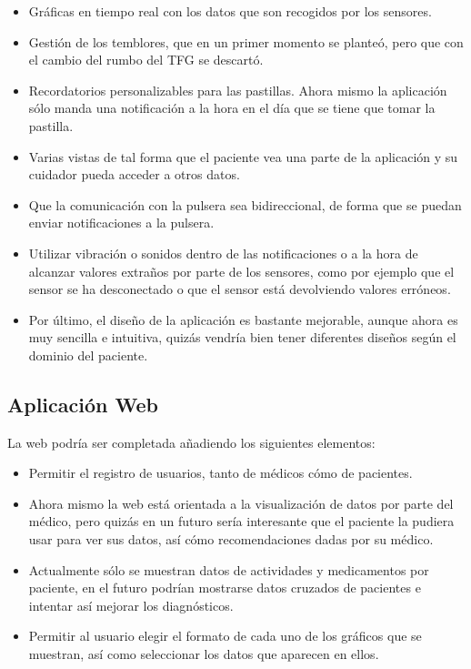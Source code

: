 \documentclass[11pt,spanish]{article}
\begin{document}
\begin{itemize}
	\item Gráficas en tiempo real con los datos que son recogidos por los sensores.
    \item Gestión de los temblores, que en un primer momento se planteó, pero que con el cambio del rumbo del TFG se descartó.
    \item Recordatorios personalizables para las pastillas. Ahora mismo la aplicación sólo manda una notificación a la hora en el día que se tiene que tomar la pastilla.
    \item Varias vistas de tal forma que el paciente vea una parte de la aplicación y su cuidador pueda acceder a otros datos.
    \item Que la comunicación con la pulsera sea bidireccional, de forma que se puedan enviar notificaciones a la pulsera.
    \item Utilizar vibración o sonidos dentro de las notificaciones o a la hora de alcanzar valores extraños por parte de los sensores, como por ejemplo que el sensor se ha desconectado o que el sensor está devolviendo valores erróneos.
    \item Por último, el diseño de la aplicación es bastante mejorable, aunque ahora es muy sencilla e intuitiva, quizás vendría bien tener diferentes diseños según el dominio del paciente.
\end{itemize}

\subsection{Aplicación Web}
La web podría ser completada añadiendo los siguientes elementos:

\begin{itemize}
	\item Permitir el registro de usuarios, tanto de médicos cómo de pacientes.
    \item Ahora mismo la web está orientada a la visualización de datos por parte del médico, pero quizás en un futuro sería interesante que el paciente la pudiera usar para ver sus datos, así cómo recomendaciones dadas por su médico.
    \item Actualmente sólo se muestran datos de actividades y medicamentos por paciente, en el futuro podrían mostrarse datos cruzados de pacientes e intentar así mejorar los diagnósticos.
    \item Permitir al usuario elegir el formato de cada uno de los gráficos que se muestran, así como seleccionar los datos que aparecen en ellos.
\end{itemize}
\end{document}
